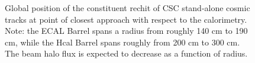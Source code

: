 \begin{figure}[htp]
  \begin{center}
    \end{center}
  \caption{Global position of the constituent rechit of CSC stand-alone cosmic tracks at point of closest approach with respect to the calorimetry. Note: the  ECAL Barrel spans a radius from roughly 140 cm to 190 cm, while the Hcal Barrel spans roughly from 200 cm to 300 cm. The beam halo flux is expected to decrease as a function of radius. } 
  \label{fig:BH_ImpactPoint}
\end{figure}




\clearpage

